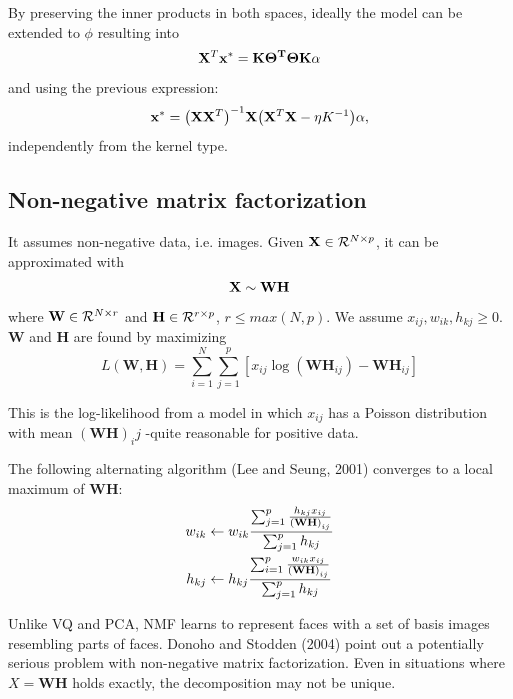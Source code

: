 By preserving the inner products in both spaces, ideally the model can be extended to $\phi$ resulting into 
\begin{equation}
\mathrm{\mathbf{X}}^T\mathbf{x}^* = \mathbf{K\Theta^T\Theta K\alpha}
\end{equation}
and using the previous expression:
\begin{equation}
\x^* = \br{\X\X^T}^{-1}\X\br{\X^T\X -\eta K^{-1}}\alpha,
\end{equation}
independently from the kernel type.


\subsection{Non-negative matrix factorization}
It assumes non-negative data, i.e. images. Given $\X \in \CMcal{R}^{N\times p}$, it can be approximated with
\begin{equation}
\mathrm{\mathbf{X}} \sim \mathbf{W}\mathbf{H}
\end{equation}
where $\mathbf{W} \in \CMcal{R}^{N\times r}$ and $\mathbf{H} \in \CMcal{R}^{r\times p}$, $r\le max(N,p)$. We assume $x_{ij}, w_{ik}, h_{kj}\ge 0$. $\mathbf{W}$ and $\mathbf{H}$ are found by maximizing
\begin{equation}
L(\mathbf{W}, \mathbf{H}) = \sum_{i=1}^N\sum_{j=1}^p \left[ x_{ij}\log(\mathbf{WH}_{ij}) - \mathbf{WH}_{ij} \right]
\end{equation}

This is the log-likelihood from a model in which $x_{ij}$ has a Poisson distribution with mean $(\mathbf{WH})_ij$ -quite reasonable for positive data.

The following alternating algorithm (Lee and Seung, 2001) converges to a local maximum of $\mathbf{WH}$:
\begin{equation}
\begin{aligned}
w_{ik} &\leftarrow w_{ik}\frac{\sum_{j=1}^p \frac{h_{kj} x_{ij}}{\left(\mathbf{WH}\right)_{ij}}}{\sum_{j=1}^p h_{kj}}\\
h_{kj} &\leftarrow  h_{kj}\frac{\sum_{i=1}^p  \frac{w_{ik}x_{ij}}{\left(\mathbf{WH}\right)_{ij}}} {\sum_{j=1}^p h_{kj}}
\end{aligned}
\end{equation}

Unlike VQ and PCA, NMF learns to represent faces with a set of basis images resembling parts of faces.
Donoho and Stodden (2004) point out a potentially serious problem with non-negative matrix factorization. Even in situations where $X = \mathbf{WH}$ holds exactly, the decomposition may not be unique.


